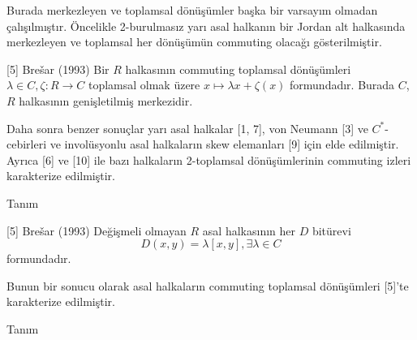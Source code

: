 \documentclass{beamer}
\begin{document}
\begin{frame}

Burada merkezleyen ve toplamsal dönüşümler başka bir varsayım olmadan çalışılmıştır.
Öncelikle 2-burulmasız yarı asal halkanın bir Jordan alt halkasında merkezleyen ve toplamsal her dönüşümün commuting olacağı gösterilmiştir.

\begin{block}{[5] Brešar (1993)}
Bir $R$ halkasının commuting toplamsal dönüşümleri $\lambda \in C, \zeta \colon R \to C$ toplamsal olmak üzere $x \mapsto \lambda x + \zeta(x)$ formundadır. Burada $C$, $R$ halkasının genişletilmiş merkezidir.
\end{block}

Daha sonra benzer sonuçlar yarı asal halkalar [1, 7], von Neumann [3] ve $C^*$-cebirleri ve involüsyonlu asal halkaların skew elemanları [9] için elde edilmiştir. Ayrıca [6] ve [10] ile bazı halkaların 2-toplamsal dönüşümlerinin commuting izleri karakterize edilmiştir.
    
\end{frame}

\begin{frame}

\begin{block}{Tanım}

\end{block}

\end{frame}

\begin{frame}

\begin{block}{[5] Brešar (1993)}
Değişmeli olmayan $R$ asal halkasının her $D$ bitürevi
\begin{equation*}
    D(x,y) = \lambda[x,y], \exists \lambda \in C
\end{equation*}
formundadır.
\end{block}

Bunun bir sonucu olarak asal halkaların commuting toplamsal dönüşümleri [5]'te karakterize edilmiştir.
    
\end{frame}

\begin{frame}

\begin{block}{Tanım}

\end{block}

\end{frame}
\end{document}
